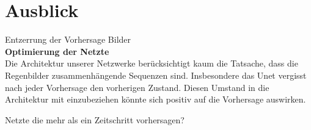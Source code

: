 \section{Ausblick}
Entzerrung der Vorhersage Bilder\\

\newpage
\noindent \textbf{Optimierung der Netzte} \\

\noindent Die Architektur unserer Netzwerke berücksichtigt kaum die Tatsache, dass die Regenbilder zusammenhängende Sequenzen sind.
Insbesondere das Unet vergisst nach jeder Vorhersage den vorherigen Zustand. Diesen Umstand in die Architektur mit einzubeziehen könnte sich positiv auf die Vorhersage auswirken.

Netzte die mehr als ein Zeitschritt vorhersagen?\\
